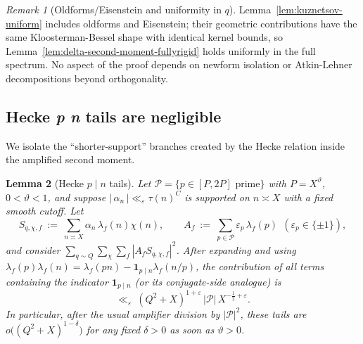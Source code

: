 \documentclass[11pt]{article}
\newtheorem{lemma}{Lemma}[part]
\theoremstyle{definition}
\theoremstyle{remark}
\newtheorem{remark}[lemma]{Remark}
\numberwithin{equation}{part}
\begin{document}
\begin{remark}[Oldforms/Eisenstein and uniformity in $q$]
	Lemma~\ref{lem:kuznetsov-uniform} includes oldforms and Eisenstein; their geometric contributions have the same Kloosterman-Bessel shape with identical kernel bounds, so Lemma~\ref{lem:delta-second-moment-fullyrigid} holds uniformly in the full spectrum. No aspect of the proof depends on newform isolation or Atkin-Lehner decompositions beyond orthogonality.
\end{remark}

\subsection{Hecke \textit p \textbar  \textit n tails are negligible}\label{sec:hecke-tails}

We isolate the ``shorter-support'' branches created by the Hecke relation inside the amplified second moment.

\begin{lemma}[Hecke $p\mid n$ tails]\label{lem:hecke-tails}
	Let $\mathcal P=\{p\in[P,2P]\text{ prime}\}$ with $P=X^\vartheta$, $0<\vartheta<1$,
	and suppose $|\,\alpha_n\,|\ll_\varepsilon \tau(n)^C$ is supported on $n\asymp X$ with a fixed smooth cutoff.
	Let
	\[
		S_{q,\chi,f}\ :=\ \sum_{n\asymp X}\alpha_n\,\lambda_f(n)\chi(n),
		\qquad
		A_f\ :=\ \sum_{p\in\mathcal P}\varepsilon_p\,\lambda_f(p)\ \ (\varepsilon_p\in\{\pm1\}),
	\]
	and consider $\sum_{q\sim Q}\sum_{\chi}\sum_f |A_f S_{q,\chi,f}|^2$.
	After expanding and using $\lambda_f(p)\lambda_f(n)=\lambda_f(pn)-\mathbf1_{p\mid n}\lambda_f(n/p)$,
	the contribution of all terms containing the indicator $\mathbf1_{p\mid n}$ (or its conjugate-side analogue) is
	\[
		\ll_\varepsilon\ (Q^2+X)^{1+\varepsilon}\,|\mathcal P|\,X^{-\tfrac12+\varepsilon}.
	\]
	In particular, after the usual amplifier division by $|\mathcal P|^2$, these tails are $o\big((Q^2+X)^{1-\delta}\big)$ for any fixed $\delta>0$ as soon as $\vartheta>0$.
\end{lemma}
\end{document}
